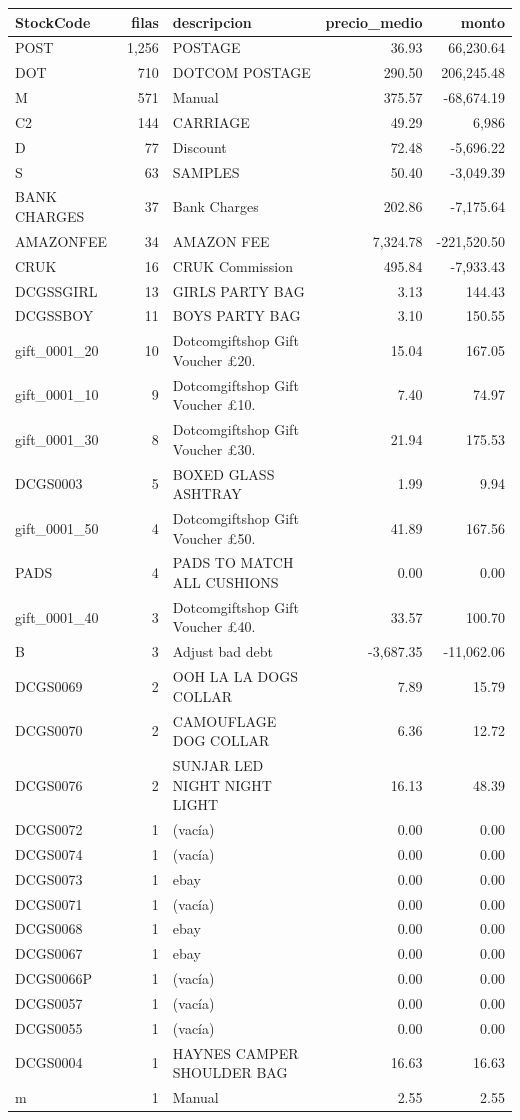 \begin{tabular}{lrlrr}
\toprule
StockCode & filas & descripcion & precio\_medio & monto \\
\midrule
POST & 1,256 & POSTAGE & 36.93 & 66,230.64 \\
DOT & 710 & DOTCOM POSTAGE & 290.50 & 206,245.48 \\
M & 571 & Manual & 375.57 & -68,674.19 \\
C2 & 144 & CARRIAGE & 49.29 & 6,986 \\
D & 77 & Discount & 72.48 & -5,696.22 \\
S & 63 & SAMPLES & 50.40 & -3,049.39 \\
BANK CHARGES & 37 & Bank Charges & 202.86 & -7,175.64 \\
AMAZONFEE & 34 & AMAZON FEE & 7,324.78 & -221,520.50 \\
CRUK & 16 & CRUK Commission & 495.84 & -7,933.43 \\
DCGSSGIRL & 13 & GIRLS PARTY BAG & 3.13 & 144.43 \\
DCGSSBOY & 11 & BOYS PARTY BAG & 3.10 & 150.55 \\
gift\_0001\_20 & 10 & Dotcomgiftshop Gift Voucher £20. & 15.04 & 167.05 \\
gift\_0001\_10 & 9 & Dotcomgiftshop Gift Voucher £10. & 7.40 & 74.97 \\
gift\_0001\_30 & 8 & Dotcomgiftshop Gift Voucher £30. & 21.94 & 175.53 \\
DCGS0003 & 5 & BOXED GLASS ASHTRAY & 1.99 & 9.94 \\
gift\_0001\_50 & 4 & Dotcomgiftshop Gift Voucher £50. & 41.89 & 167.56 \\
PADS & 4 & PADS TO MATCH ALL CUSHIONS & 0.00 & 0.00 \\
gift\_0001\_40 & 3 & Dotcomgiftshop Gift Voucher £40. & 33.57 & 100.70 \\
B & 3 & Adjust bad debt & -3,687.35 & -11,062.06 \\
DCGS0069 & 2 & OOH LA LA DOGS COLLAR & 7.89 & 15.79 \\
DCGS0070 & 2 & CAMOUFLAGE DOG COLLAR & 6.36 & 12.72 \\
DCGS0076 & 2 & SUNJAR LED NIGHT NIGHT LIGHT & 16.13 & 48.39 \\
DCGS0072 & 1 & (vacía) & 0.00 & 0.00 \\
DCGS0074 & 1 & (vacía) & 0.00 & 0.00 \\
DCGS0073 & 1 & ebay & 0.00 & 0.00 \\
DCGS0071 & 1 & (vacía) & 0.00 & 0.00 \\
DCGS0068 & 1 & ebay & 0.00 & 0.00 \\
DCGS0067 & 1 & ebay & 0.00 & 0.00 \\
DCGS0066P & 1 & (vacía) & 0.00 & 0.00 \\
DCGS0057 & 1 & (vacía) & 0.00 & 0.00 \\
DCGS0055 & 1 & (vacía) & 0.00 & 0.00 \\
DCGS0004 & 1 & HAYNES CAMPER SHOULDER BAG & 16.63 & 16.63 \\
m & 1 & Manual & 2.55 & 2.55 \\
\bottomrule
\end{tabular}
